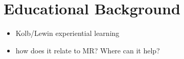 %
\chapter{Educational Background}
\label{sec:concepts}

\begin{itemize}
    \item Kolb/Lewin experiential learning
    \item how does it relate to MR? Where can it help? 
\end{itemize}
